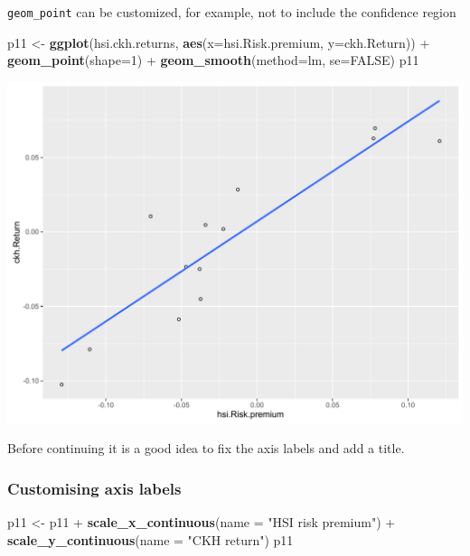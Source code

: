 \documentclass[]{article}
\newenvironment{Shaded}{\begin{snugshade}}{\end{snugshade}}
\newcommand{\KeywordTok}[1]{\textcolor[rgb]{0.13,0.29,0.53}{\textbf{{#1}}}}
\newcommand{\DataTypeTok}[1]{\textcolor[rgb]{0.13,0.29,0.53}{{#1}}}
\newcommand{\DecValTok}[1]{\textcolor[rgb]{0.00,0.00,0.81}{{#1}}}
\newcommand{\StringTok}[1]{\textcolor[rgb]{0.31,0.60,0.02}{{#1}}}
\newcommand{\OtherTok}[1]{\textcolor[rgb]{0.56,0.35,0.01}{{#1}}}
\newcommand{\NormalTok}[1]{{#1}}
\begin{document}
\texttt{geom\_point} can be customized, for example, not to include the
confidence region

\begin{Shaded}
\begin{Highlighting}[]
\NormalTok{p11 <-}\StringTok{ }\KeywordTok{ggplot}\NormalTok{(hsi.ckh.returns, }\KeywordTok{aes}\NormalTok{(}\DataTypeTok{x=}\NormalTok{hsi.Risk.premium, }\DataTypeTok{y=}\NormalTok{ckh.Return)) +}\StringTok{ }\KeywordTok{geom_point}\NormalTok{(}\DataTypeTok{shape=}\DecValTok{1}\NormalTok{) +}\StringTok{ }\KeywordTok{geom_smooth}\NormalTok{(}\DataTypeTok{method=}\NormalTok{lm, }\DataTypeTok{se=}\OtherTok{FALSE}\NormalTok{) }
\NormalTok{p11}
\end{Highlighting}
\end{Shaded}

\begin{center}\includegraphics{0_all_posts_pdf/lr_7-1} \end{center}

Before continuing it is a good idea to fix the axis labels and add a
title.

\subsubsection{Customising axis labels}\label{customising-axis-labels-4}

\begin{Shaded}
\begin{Highlighting}[]
\NormalTok{p11 <-}\StringTok{ }\NormalTok{p11 +}\StringTok{ }\KeywordTok{scale_x_continuous}\NormalTok{(}\DataTypeTok{name =} \StringTok{"HSI risk premium"}\NormalTok{) +}\StringTok{ }
\StringTok{      }\KeywordTok{scale_y_continuous}\NormalTok{(}\DataTypeTok{name =} \StringTok{"CKH return"}\NormalTok{)}
\NormalTok{p11}
\end{Highlighting}
\end{Shaded}
\end{document}
